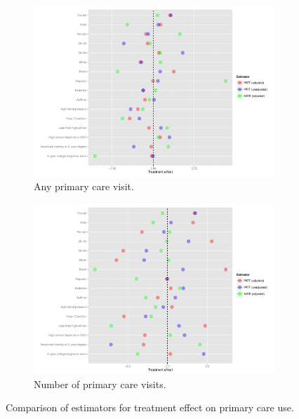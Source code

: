 \documentclass[12pt]{article}
\begin{document}
\begin{figure}
\begin{center}
     \begin{subfigure}[b]{0.86\textwidth}
    \includegraphics[width=\textwidth]{any-out-plot.pdf}
    \caption{Any primary care visit.}
    \label{fig:any-out-plot}
  \end{subfigure}
    \begin{subfigure}[b]{0.86\textwidth}
    \includegraphics[width=\textwidth]{num-out-plot.pdf}
    \caption{Number of primary care visits.}
    \label{fig:num-out-plot}
  \end{subfigure}
  \caption{Comparison of estimators for treatment effect on primary care use.}
   \end{center}
   \label{fig:out-visit}
\end{figure}
\end{document}
